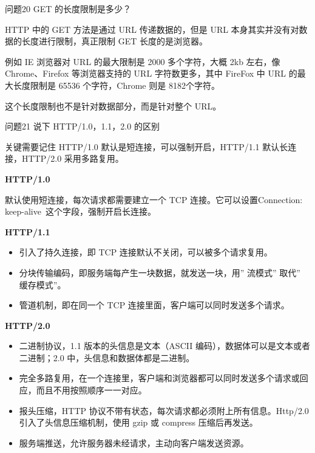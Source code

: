 \documentclass[cn,11pt,color=blue,lang=cn]{elegantbook}
\begin{document}
\begin{custom}{问题20}
GET 的长度限制是多少？
\end{custom}
\begin{solution}
HTTP 中的 GET 方法是通过 URL 传递数据的，但是 URL 本身其实并没有对数据的长度进行限制，真正限制 GET 长度的是浏览器。

例如 IE 浏览器对 URL 的最大限制是 2000 多个字符，大概 2kb 左右，像 Chrome、Firefox 等浏览器支持的 URL 字符数更多，其中 FireFox 中 URL 的最大长度限制是 65536 个字符，Chrome 则是 8182个字符。

这个长度限制也不是针对数据部分，而是针对整个 URL。
\end{solution}

\begin{custom}{问题21}
说下 HTTP/1.0，1.1，2.0 的区别
\end{custom}
\begin{solution}
关键需要记住 HTTP/1.0 默认是短连接，可以强制开启，HTTP/1.1 默认长连接，HTTP/2.0 采用多路复用。
\begin{note} \textbf{HTTP/1.0} \end{note}
默认使用短连接，每次请求都需要建立一个 TCP 连接。它可以设置Connection: keep-alive 这个字段，强制开启长连接。

\begin{note} \textbf{HTTP/1.1} \end{note}
\begin{itemize}
	\item 引入了持久连接，即 TCP 连接默认不关闭，可以被多个请求复用。
	\item 分块传输编码，即服务端每产生一块数据，就发送一块，用” 流模式” 取代” 缓存模式”。
	\item 管道机制，即在同一个 TCP 连接里面，客户端可以同时发送多个请求。
\end{itemize}

\begin{note} \textbf{HTTP/2.0} \end{note}
\begin{itemize}
	\item 二进制协议，1.1 版本的头信息是文本（ASCII 编码），数据体可以是文本或者二进制；2.0 中，头信息和数据体都是二进制。
	\item 完全多路复用，在一个连接里，客户端和浏览器都可以同时发送多个请求或回应，而且不用按照顺序一一对应。
	\item 报头压缩，HTTP 协议不带有状态，每次请求都必须附上所有信息。Http/2.0 引入了头信息压缩机制，使用 gzip 或 compress 压缩后再发送。
	\item 服务端推送，允许服务器未经请求，主动向客户端发送资源。
\end{itemize}
\end{solution}
\end{document}
